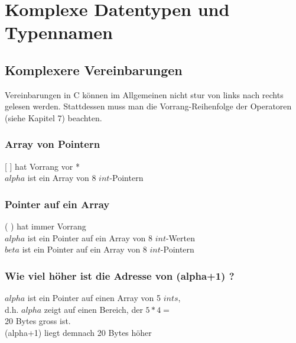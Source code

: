 \section{Komplexe Datentypen und Typennamen}
	\subsection{Komplexere Vereinbarungen}
	 	Vereinbarungen in C können im Allgemeinen nicht stur von links nach rechts gelesen werden. Stattdessen muss man die Vorrang-Reihenfolge der Operatoren (siehe Kapitel 7) beachten.
	 	\subsubsection{Array von Pointern}
			\begin{minipage}[t]{10 cm}
				\vspace*{-0.5cm}
				
			\end{minipage}
			\hspace*{0.5cm}
			\begin{minipage}[t]{10 cm}
				[ ] hat Vorrang vor *\\
				$alpha$ ist ein Array von 8 $int$-Pointern
			\end{minipage}	 	
	 	\subsubsection{Pointer auf ein Array}
		 	\begin{minipage}[t]{10 cm}
		 		\vspace*{-0.5cm}
		 		
		 	\end{minipage}
		 	\hspace*{0.5cm}
		 	\begin{minipage}[t]{10 cm}
		 		( ) hat immer Vorrang\\
		 		$alpha$ ist ein Pointer auf ein Array von 8 $int$-Werten\\
		 		$beta$ ist ein Pointer auf ein Array von 8 $int$-Pointern
		 	\end{minipage}
		\subsubsection{Wie viel höher ist die Adresse von (alpha+1) ?}
			\begin{minipage}[t]{10 cm}
				\vspace*{-0.5cm}
				
			\end{minipage}
			\hspace*{0.5cm}
			\begin{minipage}[t]{10 cm}
				$alpha$ ist ein Pointer auf einen Array von 5 $ints$,\\ d.h. $alpha$ zeigt auf einen Bereich, der $5*4 =$\\ 20 Bytes gross ist.\\ 
				(alpha+1) liegt demnach 20 Bytes höher
			\end{minipage}
